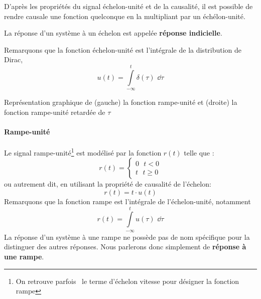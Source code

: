 D'après les propriétés du signal échelon-unité et de la causalité, il 
est possible de rendre causale une fonction quelconque en la 
multipliant par un échélon-unité.

La réponse d'un système à un échelon est appelée 
\textbf{réponse indicielle}.

Remarquons que la fonction échelon-unité est l'intégrale 
de la distribution de Dirac,
\[
    u(t)=\int\limits_{-\infty}^{t} \delta(\tau)\,\,\dd{\tau}
\]
\begin{marginfigure}
    \centering
    
    \caption{Représentation graphique de (gauche) la fonction rampe-unité et 
                                     (droite) la fonction rampe-unité retardée
                                     de $\tau$\label{fig-rampe}}
\end{marginfigure}
\paragraph{Rampe-unité}
Le signal rampe-unité\footnote{On retrouve parfois~\cite{sueurautomatique} 
le terme d'échelon vitesse pour désigner la fonction rampe} est
modélisé par la fonction $r(t)$ telle que :
\[
    r(t)=
    \begin{cases}
	0\,\,\,\,t<0 \\
	t\,\,\,\,t\geq0 
    \end{cases}
\]
ou autrement dit, en utilisant la propriété de causalité de l'échelon:
\[
    r(t)=t\cdot u(t)
\]
Remarquons que la fonction rampe est l'intégrale de l'échelon-unité, notamment 
\[
    r(t)=\int\limits_{-\infty}^{t} u(\tau)\,\,\dd{\tau}
\]
La réponse d'un système à une rampe ne possède pas de nom spécifique 
pour la distinguer des autres réponses. Nous parlerons donc simplement 
de \textbf{réponse à une rampe}. 
